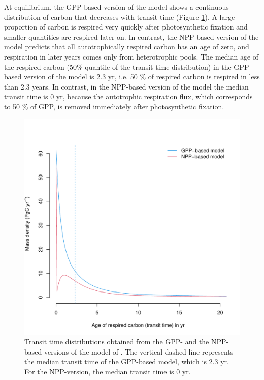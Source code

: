 \documentclass[12pt, a4paper]{article}
\begin{document}
At equilibrium, the GPP-based version of the model shows a continuous distribution of carbon that decreases with transit time (Figure \ref{fig:GPPversusNPP}). A large proportion of carbon is respired very quickly after photosynthetic fixation and smaller quantities are respired later on. In contrast, the NPP-based version of the model predicts that all autotrophically respired carbon has an age of zero, and respiration in later years comes only from heterotrophic pools. The median age of the respired carbon (50\% quantile of the transit time distribution) in the GPP-based version of the model is 2.3 yr, i.e. 50 \% of respired carbon is respired in less than 2.3 years. In contrast, in the NPP-based version of the model the median transit time is 0 yr, because the autotrophic respiration flux, which corresponds to 50 \% of GPP, is removed immediately after photosynthetic fixation. 

\begin{figure}[htbp]
   \centering
   \includegraphics[scale=0.9]{GPPversusNPP_TT.pdf} %
   \caption{Transit time distributions obtained from the GPP- and the NPP-based versions of the model of \citet{Emanuel1981}. The vertical dashed line represents the median transit time of the GPP-based model, which is 2.3 yr. For the NPP-version, the median transit time is 0 yr. }
   \label{fig:GPPversusNPP}
\end{figure}
\end{document}
